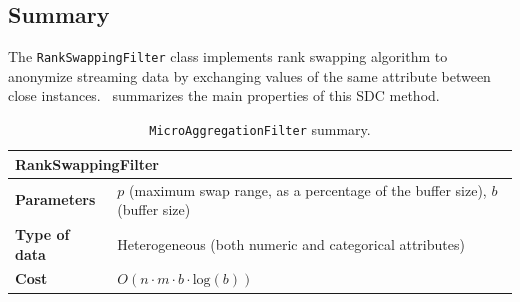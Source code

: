 \subsection{Summary}
\label{Implementation:RankSwapping:Summary}

The \texttt{RankSwappingFilter} class implements rank swapping algorithm to anonymize streaming data by exchanging values of the same attribute between close instances.~ summarizes the main properties of this SDC method.

\begin{table}[h]
	\centering
	\begin{tabular}{@{}ll@{}}
	\toprule
	\multicolumn{2}{l}{\textbf{RankSwappingFilter}}                             \\ \midrule
	\textbf{Parameters}   & $p$ (maximum swap range, as a percentage of the buffer size), $b$ (buffer size) \\
	\textbf{Type of data} & Heterogeneous (both numeric and categorical attributes) \\
	\textbf{Cost}         & $O(n \cdot m \cdot b \cdot \mathrm{log}(b))$  \\ \bottomrule
	\end{tabular}
	\caption{\texttt{MicroAggregationFilter} summary.}
	\label{table:rankswapping-summary}
\end{table}